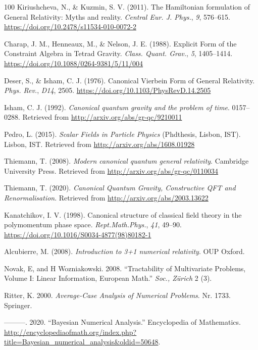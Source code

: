 \documentclass[11pt]{book}
\begin{document}
\begin{thebibliography}{100}
 Kiriushcheva, N., \& Kuzmin, S. V. (2011). The Hamiltonian formulation
of General Relativity: Myths and reality. \emph{Central Eur. J. Phys.},
\emph{9}, 576--615. \url{https://doi.org/10.2478/s11534-010-0072-2}

 Charap, J. M., Henneaux, M., \& Nelson, J. E. (1988). Explicit Form of
the Constraint Algebra in Tetrad Gravity. \emph{Class. Quant. Grav.},
\emph{5}, 1405--1414. \url{https://doi.org/10.1088/0264-9381/5/11/004}

 Deser, S., \& Isham, C. J. (1976). Canonical Vierbein Form of General
Relativity. \emph{Phys. Rev.}, \emph{D14}, 2505.
\url{https://doi.org/10.1103/PhysRevD.14.2505}

 Isham, C. J. (1992). \emph{Canonical quantum gravity and the problem of
time}. 0157--0288. Retrieved from
\url{http://arxiv.org/abs/gr-qc/9210011}

 Pedro, L. (2015). \emph{Scalar Fields in Particle Physics} (Phdthesis,
Lisbon, IST). Lisbon, IST. Retrieved from
\url{http://arxiv.org/abs/1608.01928}

 Thiemann, T. (2008). \emph{Modern canonical quantum general relativity}.
Cambridge University Press. Retrieved from
\url{http://arxiv.org/abs/gr-qc/0110034}

 Thiemann, T. (2020). \emph{Canonical Quantum Gravity, Constructive QFT
and Renormalisation}. Retrieved from
\url{http://arxiv.org/abs/2003.13622}

 Kanatchikov, I. V. (1998). Canonical structure of classical field theory
in the polymomentum phase space. \emph{Rept.Math.Phys.}, \emph{41},
49--90. \url{https://doi.org/10.1016/S0034-4877(98)80182-1}

 Alcubierre, M. (2008). \emph{Introduction to 3+1 numerical relativity}.
OUP Oxford.

 Novak, E, and H Wozniakowski. 2008. {``Tractability of Multivariate
Problems, Volume I: Linear Information, European Math.''} \emph{Soc.,
Zürich} 2 (3).

 Ritter, K. 2000. \emph{Average-Case Analysis of Numerical Problems}. Nr.
1733. Springer.

 ---------. 2020. {``Bayesian Numerical Analysis.''} Encyclopedia of
Mathematics.
\url{http://encyclopediaofmath.org/index.php?title=Bayesian_numerical_analysis\&oldid=50648}.


\end{thebibliography}
\end{document}

